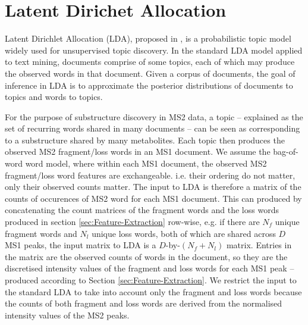 \section{Latent Dirichet Allocation\label{background-lda}}

Latent Dirichlet Allocation (LDA), proposed in \cite{Blei2003}, is a probabilistic topic model widely used for unsupervised topic discovery. In the standard LDA model applied to text mining, documents comprise of some topics, each of which may produce the observed words in that document. Given a corpus of documents, the goal of inference in LDA is to approximate the posterior distributions of documents to topics and words to topics.

For the purpose of substructure discovery in MS2 data, a topic -- explained as the set of recurring words shared in many documents -- can be seen as corresponding to a substructure shared by many metabolites. Each topic then produces the observed MS2 fragment/loss words in an MS1 document. We assume the bag-of-word word model, where within each MS1 document, the observed MS2 fragment/loss word features are exchangeable. i.e. their ordering do not matter, only their observed counts matter. The input to LDA is therefore a matrix of the counts of occurences of MS2 word for each MS1 document. This can produced by concatenating the count matrices of the fragment words and the loss words produced in section \ref{sec:Feature-Extraction} row-wise, e.g. if there are $N_{f}$ unique fragment words and $N_{l}$ unique loss words, both of which are shared across $D$ MS1 peaks, the input matrix to LDA is a $D$-by-$(N_{f}+N_{l})$ matrix. Entries in the matrix are the observed counts of words in the document, so they are the discretised intensity values of the fragment and loss words for each MS1 peak -- produced according to Section \ref{sec:Feature-Extraction}. We restrict the input to the standard LDA to take into account only the fragment and loss words because the counts of both fragment and loss words are derived from the normalised intensity values of the MS2 peaks.


